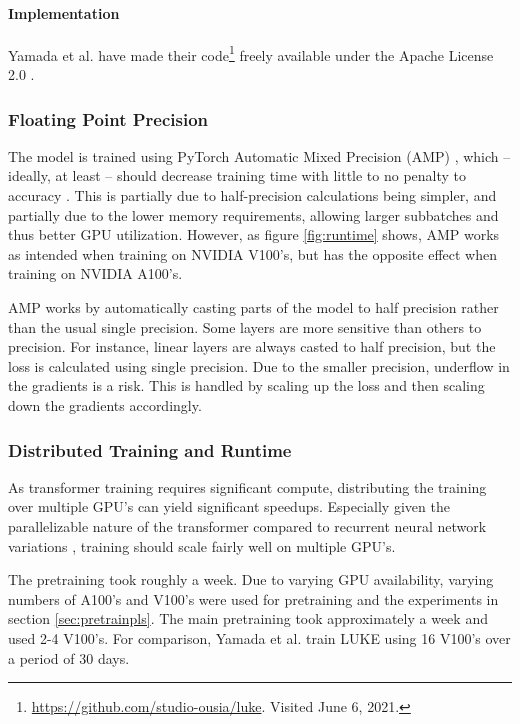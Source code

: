 \documentclass[main.tex]{subfiles}
\begin{document}
\paragraph{Implementation}
Yamada et al. have made their code\footnote{\url{https://github.com/studio-ousia/luke}. Visited June 6, 2021.} freely available under the Apache License 2.0 \cite{apachelicense}.

\subsubsection{Floating Point Precision}
The model is trained using PyTorch Automatic Mixed Precision (AMP) \cite{pytorchamp}, which -- ideally, at least -- should decrease training time with little to no penalty to accuracy \cite{huang2020amp}.
This is partially due to half-precision calculations being simpler, and partially due to the lower memory requirements, allowing larger subbatches and thus better GPU utilization.
However, as figure \ref{fig:runtime} shows, AMP works as intended when training on NVIDIA V100's, but has the opposite effect when training on NVIDIA A100's.

AMP works by automatically casting parts of the model to half precision rather than the usual single precision.
Some layers are more sensitive than others to precision.
For instance, linear layers are always casted to half precision, but the loss is calculated using single precision.
Due to the smaller precision, underflow in the gradients is a risk.
This is handled by scaling up the loss and then scaling down the gradients accordingly.
\cite{pytorchamp}

\subsubsection{Distributed Training and Runtime}
As transformer training requires significant compute, distributing the training over multiple GPU's can yield significant speedups.
Especially given the parallelizable nature of the transformer compared to recurrent neural network variations \cite{vaswani2017att}, training should scale fairly well on multiple GPU's.

The pretraining took roughly a week.
Due to varying GPU availability, varying numbers of A100's and V100's were used for pretraining and the experiments in section \ref{sec:pretrainpls}.
The main pretraining took approximately a week and used 2-4 V100's.
For comparison, Yamada et al. train LUKE using 16 V100's over a period of 30 days. \cite{yamada2020luke}
\end{document}
